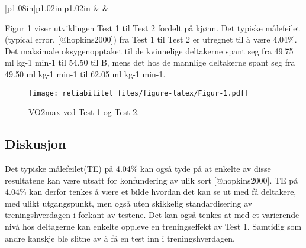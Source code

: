 \documentclass[
]{article}
\begin{document}
\begin{longtable}[c]{|p{1.08in}|p{1.02in}|p{1.02in}}
 &  &  \\

\noalign{\global\setlength{\arrayrulewidth}{2pt}}



\end{longtable}

Figur 1 viser utviklingen Test 1 til Test 2 fordelt på kjønn. Det
typiske målefeilet (typical error, {[}@hopkins2000{]}) fra Test 1 til
Test 2 er utregnet til å være 4.04\%. Det maksimale oksygenopptaket til
de kvinnelige deltakerne spant seg fra 49.75 ml kg-1 min-1 til 54.50 til
B, mens det hos de mannlige deltakerne spant seg fra 49.50 ml kg-1 min-1
til 62.05 ml kg-1 min-1.

\begin{figure}
\centering
\texttt{[image: reliabilitet\_files/figure-latex/Figur-1.pdf]}
\caption{VO2max ved Test 1 og Test 2.}
\end{figure}

\hypertarget{diskusjon}{%
\subsection{Diskusjon}\label{diskusjon}}

Det typiske målefeilet(TE) på 4.04\% kan også tyde på at enkelte av
disse resultatene kan være utsatt for konfundering av ulik sort
{[}@hopkins2000{]}. TE på 4.04\% kan derfor tenkes å være et bilde
hvordan det kan se ut med få deltakere, med ulikt utgangspunkt, men også
uten skikkelig standardisering av treningshverdagen i forkant av
testene. Det kan også tenkes at med et varierende nivå hos deltagerne
kan enkelte oppleve en treningseffekt av Test 1. Samtidig som andre
kanskje ble slitne av å få en test inn i treningshverdagen.
\end{document}
